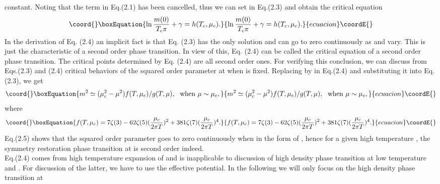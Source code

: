 \documentclass[a4paper,eqsecnum]{revtex4}
\begin{document}
constant. Noting that the \coordHE{} term in Eq.(2.1) has been cancelled, thus we can 
set \coordHE{} in Eq.(2.3) and obtain the critical equation
\begin{equation}\coord{}\boxEquation{
\ln\frac{m(0)}{T_c\pi}+\gamma= h(T_c,\mu_c).
}{
\ln\frac{m(0)}{T_c\pi}+\gamma= h(T_c,\mu_c).
}{ecuacion}\coordE{}\end{equation}%
In the derivation of Eq. (2.4) an implicit fact is that  Eq. (2.3) has the only 
solution \coordHE{} and \coordHE{} can go to zero continuously as \coordHE{} and \myHighlight{$\mu$}\coordHE{} vary. This is 
just the characteristic of a second order phase transition. In view of this, Eq. (2.4) 
can be called the critical equation of a second order phase transition. The critical 
points determined by Eq. (2.4) are all second order ones. For verifying this 
conclusion, we can discuss from Eqs.(2.3) and (2.4) critical behaviors of the squared 
order parameter \coordHE{} at \coordHE{} when \coordHE{} is fixed. Replacing \coordHE{} by \coordHE{} in Eq.(2.4) 
and substituting it into Eq. (2.3), we get
\begin{equation}\coord{}\boxEquation{
m^2\simeq (\mu_c^2-\mu^2) f(T,\mu_c)/g(T,\mu),\ 
\ {\rm when} \ \mu \sim \mu_c,
}{
m^2\simeq (\mu_c^2-\mu^2) f(T,\mu_c)/g(T,\mu),\ 
\ {\rm when} \ \mu \sim \mu_c,
}{ecuacion}\coordE{}\end{equation}%
where 
\begin{equation}\coord{}\boxEquation{
f(T,\mu_c)= 7\zeta (3)-62\zeta (5)(\frac{\mu_c}{2\pi T})^2
+381\zeta (7)(\frac{\mu_c}{2\pi T})^4.
}{
f(T,\mu_c)= 7\zeta (3)-62\zeta (5)(\frac{\mu_c}{2\pi T})^2
+381\zeta (7)(\frac{\mu_c}{2\pi T})^4.
}{ecuacion}\coordE{}\end{equation}%
Eq.(2.5) shows that the squared order parameter \coordHE{} goes to zero continuously when 
\myHighlight{$\mu\to \mu_c$}\coordHE{} in the form of \coordHE{}, hence for a given high temperature \coordHE{}, 
the symmetry restoration phase transition at \myHighlight{$\mu_c$}\coordHE{} is second order indeed.\\
\indent Eq.(2.4) comes from high temperature expansion of \myHighlight{$ F_1(T,\mu,m)$}\coordHE{} and is 
 inapplicable to discussion of high density phase transition at low temperature and 
\myHighlight{$T=0$}\coordHE{}. For discussion of the latter, we have to use the effective potential. In the following we will only focus on the high density phase transition at 
\end{document}

